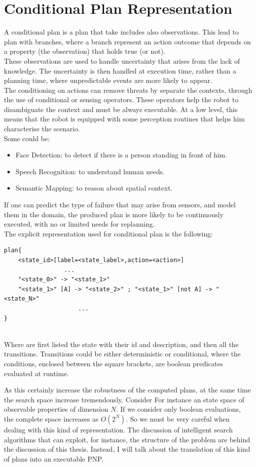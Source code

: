 \documentclass[pdftex,12pt,a4paper]{report}
\begin{document}
\section{Conditional Plan Representation}\label{cp_representation}
A conditional plan is a plan that take includes also observations.
This lead to plan with branches, where a branch represent an action outcome that depends on a property (the observation) that holds true (or not). \\
These observations are used to handle uncertainty that arises from the lack of knowledge. The uncertainty is then handled at execution time, rather than a planning time, where unpredictable events are more likely to appear.\\
The conditioning on actions can remove threats by separate the contexts, through the use of conditional or sensing operators.
These operators help the robot to disambiguate the context and must be always executable. At a low level, this means that the robot is equipped with some perception routines that helps him characterise the scenario.\\
Some could be:
\begin{itemize}
\item Face Detection: to detect if there is a person standing in front of him.
\item Speech Recognition: to understand human needs.
\item Semantic Mapping: to reason about spatial context.
\end{itemize} 
If one can predict the type of failure that may arise from sensors, and model them in the domain, the produced plan is more likely to be continuously executed, with no or limited needs for replanning.\\
The explicit representation used for conditional plan is the following:
\begin{verbatim}
plan{
    <state_id>[label=<state_label>,action=<action>]
                 ...
    "<state_0>" -> "<state_1>"
    "<state_1>" [A] -> "<state_2>" ; "<state_1>" [not A] -> "<state_N>"
                     ...
}
\end{verbatim}\\
Where are first listed the state with their id and description, and then all the transitions. Transitions could be either deterministic or conditional, where the conditions, enclosed between the square brackets, are boolean predicates evaluated at runtime.

\noindent As this certainly increase the robustness of the computed plans, at the same time the search space increase tremendously. Consider For instance an state space of observable properties of dimension $N$. If we consider only boolean evaluations, the complete space increases as $O(2^N)$. So we must be very careful when dealing with this kind of representation. The discussion of intelligent search algorithms that can exploit, for instance, the structure of the problem are behind the discussion of this thesis. Instead, I will talk about the translation of this kind of plans into an executable PNP.
\end{document}
